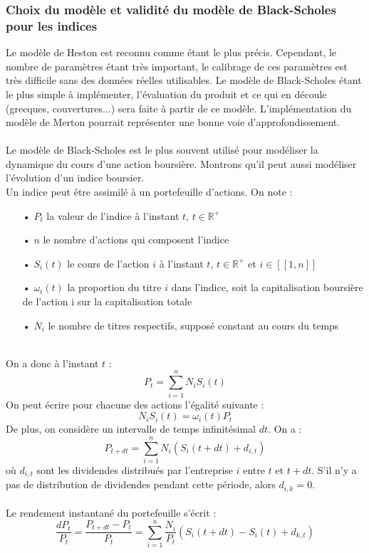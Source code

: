 \documentclass[french,12pt,a4paper]{article}
\begin{document}
\subsubsection{Choix du modèle et validité du modèle de Black-Scholes pour les indices}
Le modèle de Heston est reconnu comme étant le plus précis. Cependant, le nombre de paramètres étant très important, le calibrage de ces paramètres est très difficile sans des données réelles utilisables. Le modèle de Black-Scholes étant le plus simple à implémenter, l'évaluation du produit et ce qui en découle (grecques, couvertures...) sera faite à partir de ce modèle. L'implémentation du modèle de Merton pourrait représenter une bonne voie d'approfondissement. \\ \\
Le modèle de Black-Scholes est le plus souvent utilisé pour modéliser la dynamique du cours d'une action boursière. Montrons qu'il peut aussi modéliser l'évolution d'un indice boursier. \\
Un indice peut être assimilé à un portefeuille d'actions. On note :
\begin{itemize}
\item[•] $P_t$ la valeur de l'indice à l'instant $t$, $t \in \mathbb{R}^{+} $
\item[•] $n$ le nombre d'actions qui composent l'indice
\item[•] $S_{i}(t)$ le cours de l'action $i$ à l'instant $t$, $t \in  \mathbb{R}^{+} $ et $i \in [[1,n]] $
\item[•] $ \omega_i (t) $ la proportion du titre $i$ dans l'indice, soit la capitalisation boursière de l'action i sur la capitalisation totale
\item[•] $N_i $ le nombre de titres respectifs, supposé constant au cours du temps\\
\end{itemize}
\\
On a donc à l'instant $t$ :
$$P_t = \sum_{i=1}^{n}N_{i}S_{i}(t) $$
On peut écrire pour chacune des actions l'égalité suivante :
$$ N_{i}S_{i}(t) = \omega_i(t)P_t $$
De plus, on considère un intervalle de temps infinitésimal $dt$. On a :
$$ P_{t+dt} = \sum_{i=1}^{n}N_i(S_i(t+dt) + d_{i,t}) $$
où $d_{i,t}$ sont les dividendes distribués par l'entreprise $i$ entre $t$ et $t+dt$. S'il n'y a pas de distribution de dividendes pendant cette période, alors $d_{i,k}=0$.
\\
\\
Le rendement instantané du portefeuille s'écrit :
$$ \frac{dP_t}{P_t} = \frac{P_{t+dt}-P_t}{P_t} = \sum_{i=1}^n\frac{N_i}{P_t}(S_i(t+dt)-S_i(t) + d_{k,t})   $$
\end{document}

